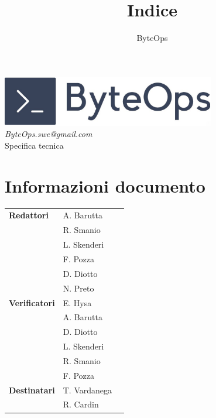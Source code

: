 \documentclass{article}
\title{\textbf{\fontsize{30}{6}\selectfont Indice}}
\author{\fontsize{14}{6}\selectfont ByteOps}
\date{}
\begin{document}
\pagestyle{fancy}
\begin{center}
    \includegraphics[width = 0.7\textwidth]{../Images/logo.png} \\
    \vspace{0.2cm}
    \textcolor[RGB]{60, 60, 60}{\textit{ByteOps.swe@gmail.com}} \\
    \vspace{1cm}
    \fontsize{16}{6}\selectfont Specifica tecnica \\
    \vspace{0.5cm}
\end{center}

\section*{Informazioni documento}
\def\arraystretch{1.2}
\begin{tabular}{>{\raggedleft\arraybackslash}p{}|>{\raggedright\arraybackslash}p{}c}
    \hline
    \addlinespace
    \textbf{Redattori}    & A. Barutta \\ & R. Smanio \\ & L. Skenderi \\ & F. Pozza \\ & D. Diotto \\ & N. Preto \vspace{10pt} \\
    \textbf{Verificatori} & E. Hysa \\ & A. Barutta \\ & D. Diotto \\ & L. Skenderi \\ & R. Smanio \\ & F. Pozza \vspace{10pt} \\
    \textbf{Destinatari}  & T. Vardanega \\ & R. Cardin \vspace{10pt}  \\
\end{tabular}
\pagebreak
\end{document}
